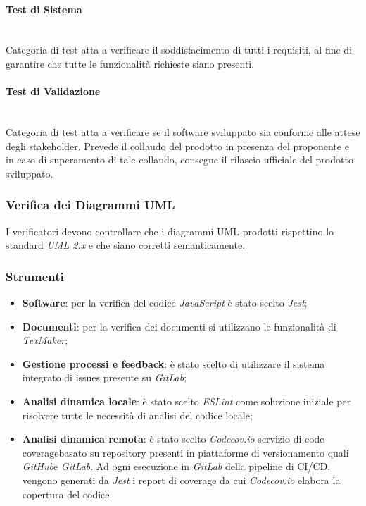 \paragraph{Test di Sistema}\-\\
Categoria di test atta a verificare il soddisfacimento di tutti i requisiti, al fine di garantire che tutte le funzionalità richieste siano presenti.

\paragraph{Test di Validazione} \-\\
Categoria di test atta a verificare se il software sviluppato sia conforme alle attese degli stakeholder.  Prevede il collaudo del prodotto in presenza del proponente e in caso di superamento di tale collaudo, consegue il rilascio ufficiale del prodotto sviluppato.

\subsubsection{Verifica dei Diagrammi UML}
I verificatori devono controllare che i diagrammi UML prodotti rispettino lo standard \textit{UML 2.x} e che siano corretti semanticamente.

\subsubsection{Strumenti}\label{StrumentiVerifica}
\begin{itemize}
	\item \textbf{Software}: per la verifica del codice \textit{JavaScript} è stato scelto \textit{Jest};
	\item \textbf{Documenti}: per la verifica dei documenti si utilizzano le funzionalità di \textit{TexMaker};
	\item \textbf{Gestione processi e feedback}: è stato scelto di utilizzare il sistema integrato di issues presente su \textit{GitLab};
	\item \textbf{Analisi dinamica locale}: è stato scelto \textit{ESLint} come soluzione iniziale per risolvere tutte le necessità di analisi del codice locale;
	\item \textbf{Analisi dinamica remota}:	è stato scelto \textit{Codecov.io} servizio di code coverage\glossario basato su repository presenti in piattaforme di versionamento quali \textit{GitHub}\glossario e \textit{GitLab}. Ad ogni esecuzione in \textit{GitLab} della pipeline di CI/CD, vengono generati da \textit{Jest} i report di coverage da cui \textit{Codecov.io} elabora la copertura del codice.
\end{itemize}

